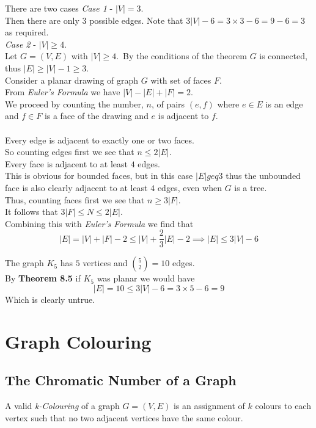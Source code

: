 \documentclass[11pt,a4paper]{article}
\begin{document}
There are two cases
\textit{Case 1} - $|V|=3$.\\
Then there are only $3$ possible edges. Note that $3|V|-6=3\times3-6=9-6=3$ as required.\\
\textit{Case 2} - $|V|\geq 4$.\\
Let $G=(V,E)$ with $|V|\geq4$.\
By the conditions of the theorem $G$ is connected, thus $|E|\geq|V|-1\geq3$.\\
Consider a planar drawing of graph $G$ with set of faces $F$.\\
From \textit{Euler's Formula} we have $|V|-|E|+|F|=2$.\\
We proceed by counting the number, $n$, of pairs $(e,f)$ where $e\in E$ is an edge and $f\in F$ is a face of the drawing and $e$ is adjacent to $f$.\\
\\
Every edge is adjacent to exactly one or two faces.\\
So counting edges first we see that $n\leq2|E|$.\\
Every face is adjacent to at least $4$ edges.\\
This is obvious for bounded faces, but in this case $|E|geq 3$ thus the unbounded face is also clearly adjacent to at least $4$ edges, even when $G$ is a tree.\\
Thus, counting faces first we see that $n\geq3|F|$.\\
It follows that $3|F|\leq N\leq2|E|$.\\
Combining this with \textit{Euler's Formula} we find that
$$|E|=|V|+|F|-2\leq|V|+\frac{2}{3}|E|-2\implies |E|\leq3|V|-6$$

The graph $K_5$ has $5$ vertices and ${{5}\choose{2}}=10$ edges.\\
By \textbf{Theorem 8.5} if $K_5$ was planar we would have
$$|E|=10\leq3|V|-6=3\times5-6=9$$
Which is clearly untrue.

\section{Graph Colouring}

\subsection{The Chromatic Number of a Graph}

A valid \textit{k-Colouring} of a graph $G=(V,E)$ is an assignment of $k$ colours to each vertex such that no two adjacent vertices have the same colour.\\
\end{document}
